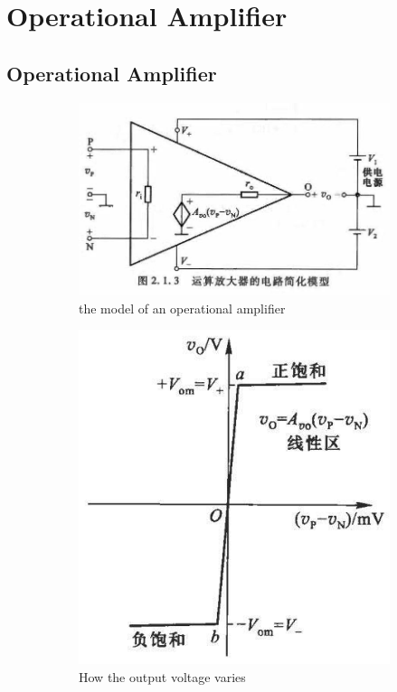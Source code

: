\chapter{Operational Amplifier}

\section{Operational Amplifier}


\begin{figure}[H]
  \centering
  \begin{subfigure}{.5\textwidth}
    \centering
    \includegraphics[width=\linewidth]{figures/comparator}
    \caption{the model of an operational amplifier}
    \label{fig:}
  \end{subfigure}%
  \begin{subfigure}{.5\textwidth}
    \centering
    \includegraphics[width=0.6\linewidth]{figures/comparator-voltage-change}
    \caption{How the output voltage varies}
    \label{fig:}
  \end{subfigure}
  \caption{}
  \label{fig:}
\end{figure}

